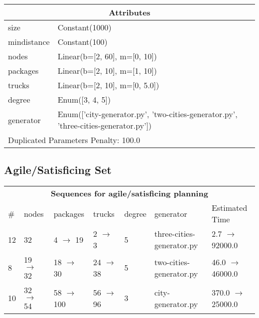 \documentclass{article}
\begin{document}
                    \begin{center}
                    \begin{tabular}{p{}p{}}
                    \multicolumn{2}{c}{\bf \large Attributes}\\\midrule
                    size & Constant(1000)\\
mindistance & Constant(100)\\
nodes & Linear(b=[2, 60], m=[0, 10])\\
packages & Linear(b=[2, 10], m=[1, 10])\\
trucks & Linear(b=[2, 10], m=[0, 5.0])\\
degree & Enum([3, 4, 5])\\
generator & Enum(['city-generator.py', 'two-cities-generator.py', 'three-cities-generator.py'])
                    
                     \\\midrule
                    \multicolumn{2}{l}{Duplicated Parameters Penalty: 100.0}
                    \end{tabular}
                    \end{center}
                
                         \subsection*{Agile/Satisficing Set}

                        \begin{center}
                        \begin{tabular}{l|l|l|l|l|l|l}
                        \multicolumn{7}{c}{\bf \large Sequences for agile/satisficing planning}\\
                        \# & nodes & packages & trucks & degree & generator & Estimated Time\\\midrule
                        12&32&4 $\rightarrow$ 19&2 $\rightarrow$ 3&5&three-cities-generator.py&2.7 $\rightarrow$ 92000.0\\
8&19 $\rightarrow$ 32&18 $\rightarrow$ 30&24 $\rightarrow$ 38&5&two-cities-generator.py&46.0 $\rightarrow$ 46000.0\\
10&32 $\rightarrow$ 54&58 $\rightarrow$ 100&56 $\rightarrow$ 96&3&city-generator.py&370.0 $\rightarrow$ 25000.0
                        \end{tabular}
                        \end{center}
                    
\end{document}
